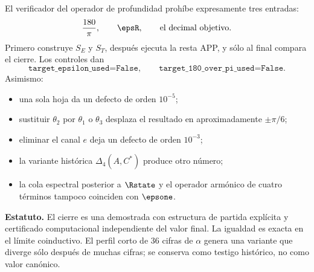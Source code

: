 El verificador del operador de profundidad prohíbe expresamente tres entradas:
\[
\frac{180}{\pi},\qquad \epsR,\qquad
\text{el decimal objetivo}.
\]
Primero construye \(S_E\) y \(S_T\), después ejecuta la resta APP, y sólo al
final compara el cierre. Los controles dan
\[
\texttt{target\_epsilon\_used=False},\qquad
\texttt{target\_180\_over\_pi\_used=False}.
\]
Asimismo:
\begin{itemize}
\item una sola hoja da un defecto de orden \(10^{-5}\);
\item sustituir \(\theta_2\) por \(\theta_1\) o \(\theta_3\) desplaza el
resultado en aproximadamente \(\pm\pi/6\);
\item eliminar el canal \(e\) deja un defecto de orden \(10^{-3}\);
\item la variante histórica \(\Delta_4(A,C^*)\) produce otro número;
\item la cola espectral posterior a \(\Rstate\) y el operador armónico de
cuatro términos tampoco coinciden con \(\epsone\).
\end{itemize}

\begin{statusbox}
\textbf{Estatuto.} El cierre es una  demostrada
con estructura de partida explícita y certificado computacional independiente del valor final.
La igualdad es exacta en el límite coinductivo. El perfil corto de 36 cifras
de \(\alpha\) genera una variante que diverge sólo después de muchas cifras;
se conserva como testigo histórico, no como valor canónico.
\end{statusbox}

